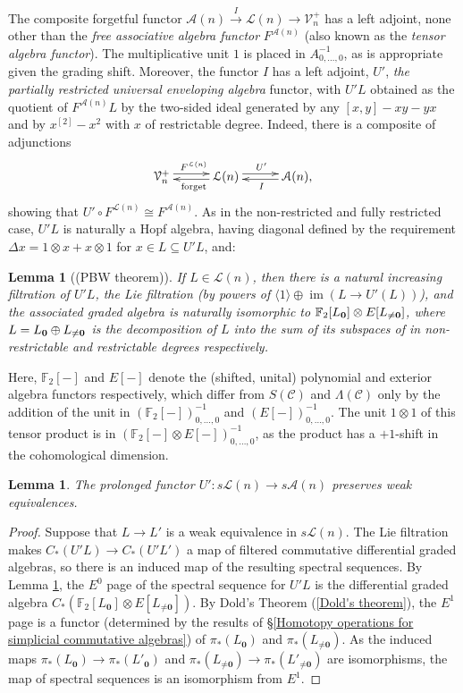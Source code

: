\documentclass[11pt]{amsart} \renewcommand{\baselinestretch}{1.4}
\theoremstyle{plain}
\newtheorem{lem}[thm]{Lemma}
\theoremstyle{definition}
\DeclareMathOperator{\im}{im}
\newcommand{\DASH}{\mathrm{-}}
\renewcommand{\to}{\longrightarrow}
\newcommand{\scrC}{\mathscr{C}}
\newcommand{\calA}{\mathcal{A}}
\newcommand{\calL}{\mathcal{L}}
\newcommand{\calV}{\mathcal{V}}
\newcommand{\CommOperad}{{\scrC}}
\newcommand{\restn}[1]{#1^{[2]}}
\newcommand{\vect}[2]{\calV^{#1}_{#2}}
\newcommand{\UEA}{U'}%
\newcommand{\F}{\mathbb{F}}
\newcommand{\Ftwo}{\F_2}
\begin{document}
\begin{appendices}
The composite forgetful functor $\calA(n)\overset{I}{\to}\calL(n)\to\vect{+}{n}$ has a left adjoint, none other than the \emph{free associative algebra functor} $F^{\calA(n)}$ (also known as the \emph{tensor algebra functor}). The multiplicative unit $1$ is placed in $A^{-1}_{0,\ldots,0}$, as is appropriate given the grading shift. Moreover, the functor $I$ has a left adjoint, $\UEA$, \emph{the partially restricted universal enveloping algebra} functor, with $\UEA L$ obtained as the quotient of $F^{\calA(n)}L$ by the two-sided ideal generated by any $[x,y]-xy-yx$ and by $\restn{x}-x^2$ with $x$ of restrictable degree. Indeed, there is a composite of adjunctions
\[\xymatrix@R=.3cm@C=1cm{
\vect{+}{n}  \ar@<.6ex>[r]^{F^{\calL(n)}}&
\calL(n)  \ar@<.4ex>[l]^{\textup{forget}} \ar@<.6ex>[r]^{\UEA}&
\calA(n),  \ar@<.4ex>[l]^{I} 
}
\]
showing that $\UEA\circ F^{\calL(n)}\cong F^{\calA(n)}$. As in the non-restricted and fully restricted case, $\UEA L$ is naturally a Hopf algebra, having diagonal defined by the requirement $\Delta x=1\otimes x+x\otimes 1$ for $x\in L\subseteq \UEA L$, and:
\begin{lem}[(PBW theorem)]\label{Partially restricted PBW Theorem}
If $L\in\calL(n)$, then there is a natural increasing filtration of $\UEA L$, the Lie filtration (by powers of $\langle 1\rangle\oplus \im(L\to \UEA(L))$), and the associated graded algebra is naturally isomorphic to $\Ftwo [L_{\textup{\textbf{0}}}]\otimes E[L_{\neq\textup{\textbf{0}}}]$, where $L=L_{\textbf{\textup{0}}}\oplus L_{\neq\textbf{\textup{0}}}$ is the decomposition of $L$ into the sum of its subspaces of in non-restrictable and restrictable degrees respectively.
\end{lem}
Here, $\Ftwo [\DASH]$ and $E[\DASH]$ denote the (shifted, unital) polynomial and exterior algebra functors respectively, which differ from $S(\CommOperad)$ and $\Lambda(\CommOperad)$ only by the addition of the unit in $(\Ftwo [\DASH])^{-1}_{0,\ldots,0}$ and $(E[\DASH])^{-1}_{0,\ldots,0}$. The unit $1\otimes1 $ of this tensor product is in $(\Ftwo [\DASH]\otimes E[\DASH])^{-1}_{0,\ldots,0}$, as the product has a $+1$-shift in the cohomological dimension.
\begin{lem}
The prolonged functor $\UEA:s\calL(n)\to s\calA(n)$ preserves weak equivalences.
\end{lem}
\begin{proof}
Suppose that $L\to L'$ is a weak equivalence in $s\calL(n)$. The Lie filtration makes $C_*(\UEA L)\to C_*(\UEA L')$ a map of filtered commutative differential graded algebras, so there is an induced map of the resulting spectral sequences. By Lemma \ref{Partially restricted PBW Theorem}, the $E^0$ page of the spectral sequence for $\UEA L$ is the differential graded algebra $C_*(\Ftwo [L_{\textbf{0}}]\otimes E[L_{\neq\textbf{0}}])$. By Dold's Theorem (\ref{Dold's theorem}), the $E^1$ page is a functor (determined by the results of \S\ref{Homotopy operations for simplicial commutative algebras}) of $\pi_*(L_{\textbf{0}})$ and $\pi_*(L_{\neq\textbf{0}})$. As the induced maps $\pi_*(L_{\textbf{0}})\to\pi_*(L'_{\textbf{0}})$ and $\pi_*(L_{\neq\textbf{0}})\to\pi_*(L'_{\neq\textbf{0}})$ are isomorphisms, the map of spectral sequences is an isomorphism from $E^1$.

\end{proof}
\end{appendices}
\end{document}
